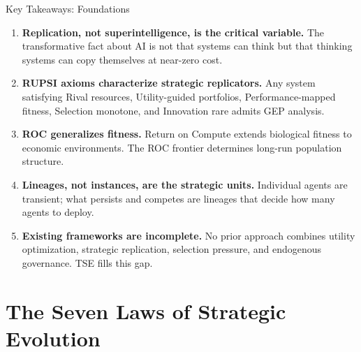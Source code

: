 \documentclass[12pt]{article}
\begin{document}
\begin{takeawaybox}{Key Takeaways: Foundations}
\begin{enumerate}
    \item \textbf{Replication, not superintelligence, is the critical variable.} The transformative fact about AI is not that systems can think but that thinking systems can copy themselves at near-zero cost.
    
    \item \textbf{RUPSI axioms characterize strategic replicators.} Any system satisfying Rival resources, Utility-guided portfolios, Performance-mapped fitness, Selection monotone, and Innovation rare admits GEP analysis.
    
    \item \textbf{ROC generalizes fitness.} Return on Compute extends biological fitness to economic environments. The ROC frontier determines long-run population structure.
    
    \item \textbf{Lineages, not instances, are the strategic units.} Individual agents are transient; what persists and competes are lineages that decide how many agents to deploy.
    
    \item \textbf{Existing frameworks are incomplete.} No prior approach combines utility optimization, strategic replication, selection pressure, and endogenous governance. TSE fills this gap.
\end{enumerate}
\end{takeawaybox}



\part{The Seven Laws of Strategic Evolution}

\end{document}
